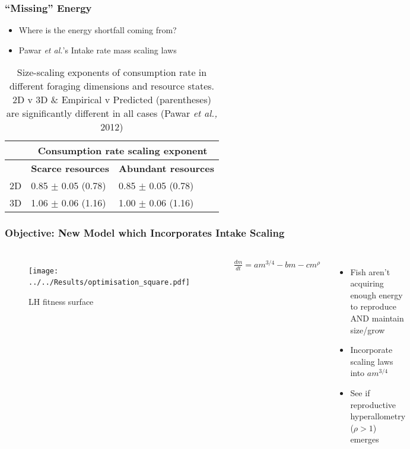 \documentclass[handout]{beamer}
\begin{document}
\begin{frame}
	\frametitle{``Missing'' Energy}
	\begin{itemize}
		\item Where is the energy shortfall coming from?
		\item Pawar \textit{et al.}'s Intake rate mass scaling laws
	\end{itemize}
	\begin{table}
		\tiny
		\caption{Size-scaling exponents of consumption rate in different foraging dimensions and resource states. 2D v 3D \& Empirical v Predicted (parentheses) are significantly different in all cases (Pawar \textit{et al.,} 2012)}
		\begin{tabularx}{\linewidth}{|X|X|X|}
		\toprule
		& \multicolumn{2}{c}{\textbf{Consumption rate scaling exponent}}                                        \\
		\midrule
		& \multicolumn{1}{c}{\textbf{Scarce resources}} & \multicolumn{1}{c}{\textbf{Abundant resources}} \\
		\midrule
		2D & 0.85 $\pm$ 0.05 (0.78)                      & 0.85 $\pm$ 0.05 (0.78)                        \\
		\midrule
		3D & 1.06 $\pm$ 0.06 (1.16)                      & 1.00 $\pm$ 0.06 (1.16)                       \\              
		\bottomrule
		\end{tabularx}
	\end{table}
\end{frame}


\begin{frame}
	\frametitle{Objective: New Model which Incorporates Intake Scaling}
	\begin{columns}[]
			\centering
			\begin{figure}
				\texttt{[image: ../../Results/optimisation\_square.pdf]}\
				\caption{LH fitness surface}
			\end{figure}
		\begin{align*}
			\frac{dm}{dt} = am^{3/4} - bm - cm^{\rho}
		\end{align*}
			\begin{itemize}
				\item Fish aren't acquiring enough energy to reproduce AND maintain size/grow
				\item Incorporate scaling laws into $am^{3/4}$
				\item See if reproductive hyperallometry ($\rho > 1$) emerges
			\end{itemize}			
	\end{columns}
\end{frame}
\end{document}

